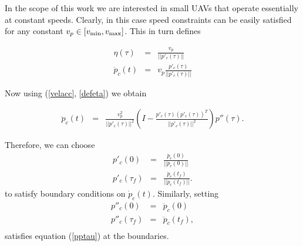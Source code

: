 \documentclass[]{aiaa-tc}%
\begin{document}
%
%

In the scope of this work we are interested in small UAVs that operate essentially at constant speeds.
Clearly, in this case speed constraints can be easily satisfied for any constant $ v_p \in [v_{{\rm min}},
v_{{\rm max}} ]$. This in turn defines

\begin{eqnarray}
\eta(\tau) &=&  \frac{v_p}{||p'_c(\tau)||} \label{defeta}\\
\dot p_c(t) &=& v_p \frac{p'_c(\tau)}{|| p'_c(\tau)||} \label{ptau}
\end{eqnarray}

\noindent Now using (\ref{velacc}, \ref{defeta}) we obtain

\begin{eqnarray}
\ddot{p}_c(t)&=&\frac{v_p^2}{||p'_c(\tau)||^2} (I - \frac{p'_c(\tau)
(p'_c(\tau))^T}{||p'_c(\tau)||^2}) p''(\tau). \label{pptau}
\end{eqnarray}

\noindent Therefore, we can choose
\begin{eqnarray}
p'_c(0) &=& \frac{\dot p_c(0)}{||\dot p_c(0)||} \label{ptau0} \\
p'_c(\tau_f) &=& \frac{\dot p_c(t_f)}{||\dot p_c(t_f)||}.
\label{ptauf}
\end{eqnarray}
\noindent to satisfy boundary conditions on $\dot p_c(t)$. Similarly, setting
\begin{eqnarray*}
p''_c(0) &=& \ddot p_c(0) \label{pptau0} \\
p''_c(\tau_f) &=& \ddot p_c(t_f)  \label{pptauf}, \\
\end{eqnarray*}
satisfies equation (\ref{pptau}) at the boundaries.
\end{document}

